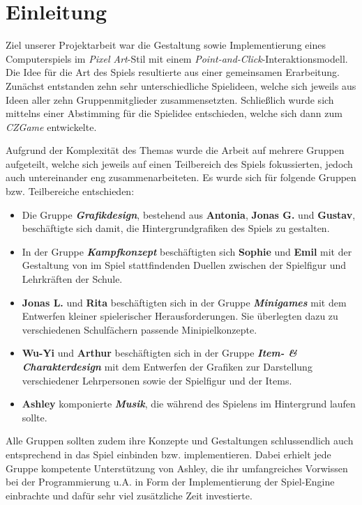 \chapter{Einleitung}

	Ziel unserer Projektarbeit war die Gestaltung sowie Implementierung eines Computerspiels im \textit{Pixel Art}-Stil mit einem \textit{Point-and-Click}-Interaktionsmodell. \\
    Die Idee für die Art des Spiels resultierte aus einer gemeinsamen Erarbeitung. Zunächst entstanden zehn sehr unterschiedliche Spielideen, welche
    sich jeweils aus Ideen aller zehn Gruppenmitglieder zusammensetzten. Schließlich wurde sich mittelns einer
    Abstimming für die Spielidee entschieden, welche sich dann zum \textit{CZGame} entwickelte.
    
	Aufgrund der Komplexität des Themas wurde die Arbeit auf mehrere Gruppen aufgeteilt, welche sich jeweils
	auf einen Teilbereich des Spiels fokussierten, jedoch auch untereinander eng zusammenarbeiteten.
	Es wurde sich für folgende Gruppen bzw. Teilbereiche entschieden:
	
	\begin{itemize}
		
		\item Die Gruppe \textit{\textbf{Grafikdesign}}, bestehend aus \textbf{Antonia}, \textbf{Jonas G.} und
			\textbf{Gustav}, beschäftigte sich damit, die Hintergrundgrafiken des Spiels zu gestalten.
	
		\item In der Gruppe \textit{\textbf{Kampfkonzept}} beschäftigten sich \textbf{Sophie} und \textbf{Emil}
			mit der Gestaltung von im Spiel stattfindenden Duellen zwischen der Spielfigur und Lehrkräften
			der Schule.
	
		\item \textbf{Jonas L.} und \textbf{Rita} beschäftigten sich in der Gruppe \textit{\textbf{Minigames}} mit dem
			Entwerfen kleiner spielerischer Herausforderungen. Sie überlegten  dazu zu verschiedenen
			Schulfächern passende Minipielkonzepte.
	
		\item \textbf{Wu-Yi} und \textbf{Arthur} beschäftigten sich in der Gruppe \textit{\textbf{Item- \& Charakterdesign}}
			mit dem Entwerfen der Grafiken zur Darstellung verschiedener Lehrpersonen sowie der Spielfigur und der Items.
	
		\item \textbf{Ashley} komponierte \textit{\textbf{Musik}}, die während des Spielens im Hintergrund laufen sollte.
	
	\end{itemize}

	Alle Gruppen sollten zudem ihre Konzepte und Gestaltungen schlussendlich auch entsprechend in das Spiel
	einbinden bzw. implementieren. Dabei erhielt jede Gruppe kompetente Unterstützung von Ashley, die
	ihr umfangreiches Vorwissen bei der Programmierung u.A. in Form der Implementierung der Spiel-Engine einbrachte
	und dafür sehr viel zusätzliche Zeit investierte.
